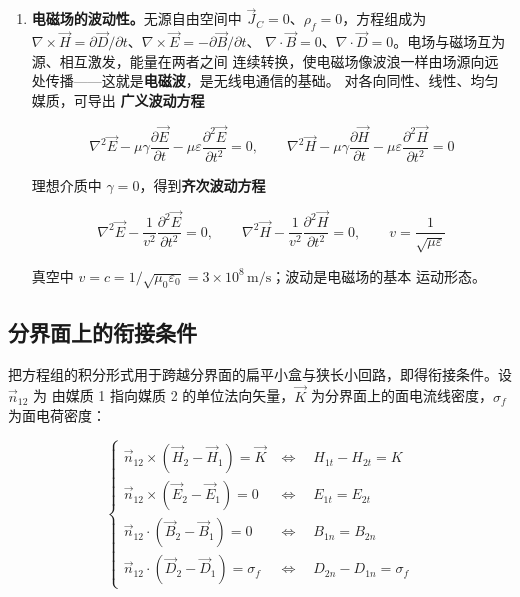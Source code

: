 \begin{enumerate}
  \item \textbf{电磁场的波动性。}无源自由空间中 $\vec{J}_C=0$、$\rho_f=0$，方程组成为
  $\nabla\times\vec{H}=\partial\vec{D}/\partial t$、$\nabla\times\vec{E}=-\partial\vec{B}/\partial t$、
  $\nabla\cdot\vec{B}=0$、$\nabla\cdot\vec{D}=0$。电场与磁场互为源、相互激发，能量在两者之间
  连续转换，使电磁场像波浪一样由场源向远处传播——这就是\textbf{电磁波}，是无线电通信的基础。
  对各向同性、线性、均匀媒质，可导出
  \textbf{广义波动方程}
  \begin{formulaBox}
  \[
  \nabla^2\vec{E}-\mu\gamma\frac{\partial \vec{E}}{\partial t}
  -\mu\varepsilon\frac{\partial^2\vec{E}}{\partial t^2}=0,
  \qquad
  \nabla^2\vec{H}-\mu\gamma\frac{\partial \vec{H}}{\partial t}
  -\mu\varepsilon\frac{\partial^2\vec{H}}{\partial t^2}=0
  \]
  \end{formulaBox}
  理想介质中 $\gamma=0$，得到\textbf{齐次波动方程}
  \begin{formulaBox}
  \[
  \nabla^2\vec{E}-\frac{1}{v^2}\frac{\partial^2\vec{E}}{\partial t^2}=0,
  \qquad
  \nabla^2\vec{H}-\frac{1}{v^2}\frac{\partial^2\vec{H}}{\partial t^2}=0,
  \qquad v=\frac{1}{\sqrt{\mu\varepsilon}}
  \]
  \end{formulaBox}
  真空中 $v=c=1/\sqrt{\mu_0\varepsilon_0}=3\times10^{8}\,\mathrm{m/s}$；波动是电磁场的基本
  运动形态。
\end{enumerate}

\subsection{分界面上的衔接条件}

把方程组的积分形式用于跨越分界面的扁平小盒与狭长小回路，即得衔接条件。设 $\vec{n}_{12}$ 为
由媒质 1 指向媒质 2 的单位法向矢量，$\vec{K}$ 为分界面上的面电流线密度，$\sigma_f$ 为面电荷密度：

\begin{formulaBox}
\[
\begin{cases}
\vec{n}_{12}\times(\vec{H}_2-\vec{H}_1)=\vec{K}
&\Longleftrightarrow\quad H_{1t}-H_{2t}=K\\[6pt]
\vec{n}_{12}\times(\vec{E}_2-\vec{E}_1)=0
&\Longleftrightarrow\quad E_{1t}=E_{2t}\\[6pt]
\vec{n}_{12}\cdot(\vec{B}_2-\vec{B}_1)=0
&\Longleftrightarrow\quad B_{1n}=B_{2n}\\[6pt]
\vec{n}_{12}\cdot(\vec{D}_2-\vec{D}_1)=\sigma_f
&\Longleftrightarrow\quad D_{2n}-D_{1n}=\sigma_f
\end{cases}
\]
\end{formulaBox}

